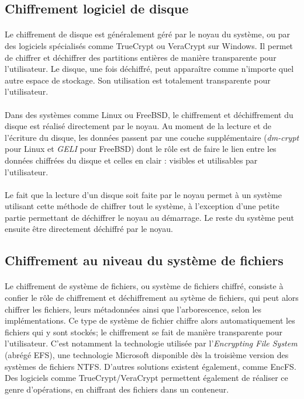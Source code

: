 \subsection{Chiffrement logiciel de disque}
\paragraph{}
Le chiffrement de disque est généralement géré par le noyau du système, ou par
des logiciels spécialisés comme TrueCrypt ou VeraCrypt sur Windows. Il permet de
chiffrer et déchiffrer des partitions entières de manière transparente pour
l'utilisateur. Le disque, une fois
déchiffré, peut apparaître comme n'importe quel autre espace de stockage. Son
utilisation est totalement transparente pour l'utilisateur.
\paragraph{}
Dans des systèmes comme Linux ou FreeBSD, le chiffrement et déchiffrement du
disque est réalisé directement par le noyau. Au moment de la lecture et de
l'écriture du disque, les données passent par une couche supplémentaire
(\textit{dm-crypt} pour Linux et \textit{GELI}\cite{manGeli} pour FreeBSD) dont
le rôle est de faire le lien entre les données chiffrées du disque et celles en
clair : visibles et utilisables par l'utilisateur.
\paragraph{}
Le fait que la lecture d'un disque soit faite par le noyau permet à un système
utilisant cette méthode de chiffrer tout le système, à l'exception d'une petite
partie permettant de déchiffrer le noyau au démarrage. Le reste du système peut
ensuite être directement déchiffré par le noyau.

\subsection{Chiffrement au niveau du système de fichiers}
\paragraph{}
Le chiffrement de système de fichiers, ou système de fichiers chiffré, consiste
à confier le rôle de chiffrement et déchiffrement au sytème de fichiers, qui
peut alors chiffrer les fichiers, leurs métadonnées ainsi que l'arborescence,
selon les implémentations. Ce type de système de fichier chiffre alors
automatiquement les fichiers qui y sont stockés; le chiffrement se fait de manière
transparente pour l'utilisateur.
C'est notamment la technologie utilisée par l'\textit{Encrypting File
  System} (abrégé EFS), une technologie Microsoft disponible dès la troisième
version des systèmes de fichiers NTFS. D'autres solutions existent également,
comme EncFS. Des logiciels comme TrueCrypt/VeraCrypt permettent également de
réaliser ce genre d'opérations, en chiffrant des fichiers dans un conteneur.
